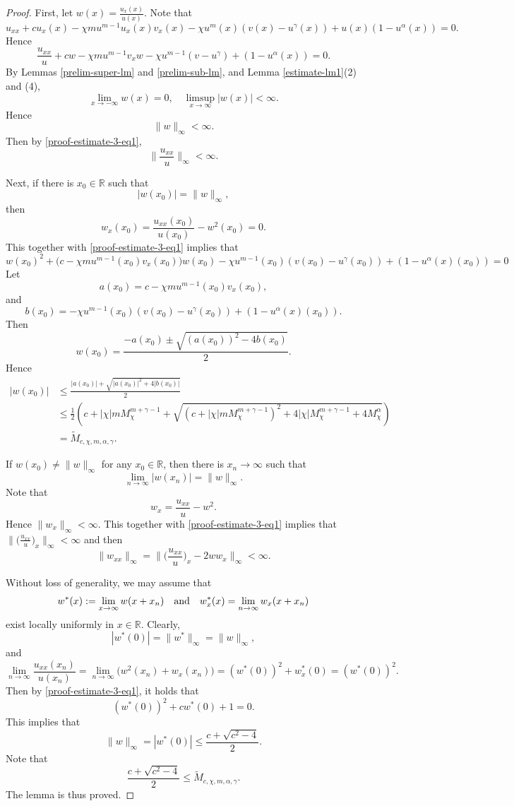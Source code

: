 \documentclass[11pt]{article} %
\theoremstyle{remark}
\theoremstyle{remark}
\numberwithin{equation}{section}
\numberwithin{figure}{section}
\numberwithin{table}{section}
\newcommand\RR{\ensuremath{\mathbb{R}}}
\begin{document}
\begin{proof}
First, let $w(x)=\frac{u_x(x)}{u(x)}$.
Note that
$$
u_{xx}+c u_x(x)-\chi m u^{m-1} u_x(x) v_x(x)-\chi u^m(x) (v(x)-u^\gamma (x))+u(x) (1-u^\alpha(x))=0.
$$
Hence
\begin{equation}
\label{proof-estimate-3-eq1}
\frac{u_{xx}}{u}+c w -\chi m u^{m-1} v_x w -\chi u^{m-1} (v-u^\gamma)+(1-u^\alpha(x))=0.
\end{equation}
By Lemmas \ref{prelim-super-lm} and \ref{prelim-sub-lm}, and   Lemma \ref{estimate-lm1}(2) and (4), 
$$
\lim_{x\to -\infty} w(x)=0,\quad \limsup_{x\to\infty}|w(x)|<\infty.
$$
Hence 
$$
\|w\|_\infty<\infty.
$$
Then by \eqref{proof-estimate-3-eq1},
$$
\|\frac{u_{xx}}{u}\|_\infty<\infty.
$$

Next, if there is $x_0\in\RR$ such that
$$
|w(x_0)|=\|w\|_\infty,
$$
then
$$
w_x(x_0)=\frac{u_{xx}(x_0)}{u(x_0)}-w^2 (x_0)=0.
$$
This together with \eqref{proof-estimate-3-eq1} implies that
$$
w(x_0)^2+\Big(c-\chi m u^{m-1}(x_0)v_x(x_0)\big) w(x_0) -\chi u^{m-1}(x_0) (v(x_0)-u^\gamma(x_0))+(1-u^\alpha(x)(x_0))=0
$$
Let 
$$a(x_0)=c-\chi m u^{m-1}(x_0)v_x(x_0),
$$
and
$$
b(x_0)=-\chi u^{m-1}(x_0) (v(x_0)-u^\gamma(x_0))+(1-u^\alpha(x)(x_0)).
$$
Then 
$$
w(x_0)= \frac{-a(x_0)\pm \sqrt{(a(x_0))^2- 4 b(x_0)}}{2}.
$$
Hence
\begin{align*}
|w(x_0)|&\le\frac{|a(x_0)| +\sqrt{|a(x_0)|^2+4|b(x_0)|}}{2}\\
&\le \frac{1}{2}\left( c+|\chi| m M_{\chi}^{m+\gamma-1}+\sqrt{ (c+|\chi| m M_{\chi}^{m+\gamma-1})^2 +4|\chi| M_{\chi}^{m+\gamma-1}+4M_{\chi}^\alpha}\right)\\
&=\widetilde M_{c,\chi,m,\alpha,\gamma}.
\end{align*}



If $w(x_0)\not = \|w\|_\infty$ for any $x_0\in\RR$, then there is $x_n\to\infty$ such that
$$
\lim_{n\to\infty} |w(x_n)|=\|w\|_\infty.
$$
Note that
$$
w_x=\frac{u_{xx}}{u}-w^2.
$$
Hence $\|w_x\|_\infty<\infty$. This together with \eqref{proof-estimate-3-eq1} implies that
$\|\big(\frac{u_{xx}}{u}\big)_x\|_\infty<\infty$ and then
$$
\|w_{xx}\|_\infty=\|\big(\frac{u_{xx}}{u}\big)_x-2w w_x\|_\infty<\infty.
$$


  Without loss of generality, we may assume that
$$
w^*(x):=\lim_{x\to\infty} w(x+x_n) \quad {\rm and} \quad w^*_x(x)=\lim_{n\to\infty} w_x(x+x_n)
$$
exist locally uniformly in $x\in\RR$.  Clearly,
$$
|w^*(0)|=\|w^*\|_\infty=\|w\|_\infty,
$$
and 
$$
\lim_{n\to\infty} \frac{u_{xx}(x_n)}{u(x_n)}=\lim_{n\to\infty} \big(w^2(x_n)+w_x(x_n)\big)=(w^*(0))^2+w_x^*(0)=(w^*(0))^2.
$$
Then  by \eqref{proof-estimate-3-eq1}, it holds that
$$
(w^*(0))^2+cw^*(0) +1=0.
$$
This implies that
$$
\|w\|_\infty=|w^*(0)|\le \frac{c+\sqrt{c^2-4}}{2}.
$$
Note that
$$
\frac{c+\sqrt{c^2-4}}{2}\le \widetilde M_{c,\chi,m,\alpha,\gamma}.
$$
The lemma is thus proved.
\end{proof}
\end{document}
